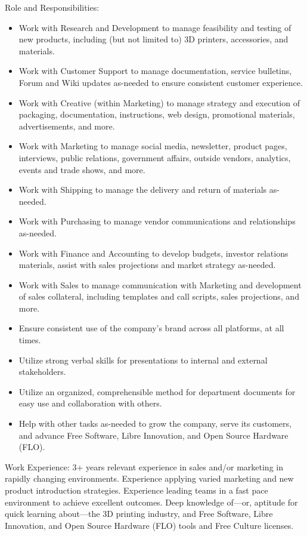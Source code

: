 Role and Responsibilities:
\begin{itemize}
 \item Work with Research and Development to manage feasibility and testing of new products, including (but not limited to) 3D printers, accessories, and materials.
 \item Work with Customer Support to manage documentation, service bulletins, Forum and Wiki updates as-needed to ensure consistent customer experience.
 \item Work with Creative (within Marketing) to manage strategy and execution of packaging, documentation, instructions, web design, promotional materials, advertisements, and more.
 \item Work with Marketing to manage social media, newsletter, product pages, interviews, public relations, government affairs, outside vendors, analytics, events and trade shows, and more.
 \item Work with Shipping to manage the delivery and return of materials as-needed.
 \item Work with Purchasing to manage vendor communications and relationships as-needed.
 \item Work with Finance and Accounting to develop budgets, investor relations materials, assist with sales projections and market strategy as-needed.
 \item Work with Sales to manage communication with Marketing and development of sales collateral, including templates and call scripts, sales projections, and more.
 \item Ensure consistent use of the company's brand across all platforms, at all times.
 \item Utilize strong verbal skills for presentations to internal and external stakeholders.
 \item Utilize an organized, comprehensible method for department documents for easy use and collaboration with others.
 \item Help with other tasks as-needed to grow the company, serve its customers, and advance Free Software, Libre Innovation, and Open Source Hardware (FLO).
\end{itemize}

Work Experience:
3+ years relevant experience in sales and/or marketing in rapidly changing environments.
Experience applying varied marketing and new product introduction strategies.
Experience leading teams in a fast pace environment to achieve excellent outcomes.
Deep knowledge of—or, aptitude for quick learning about—the 3D printing industry, and Free Software, Libre Innovation, and Open Source Hardware (FLO) tools and Free Culture licenses.

